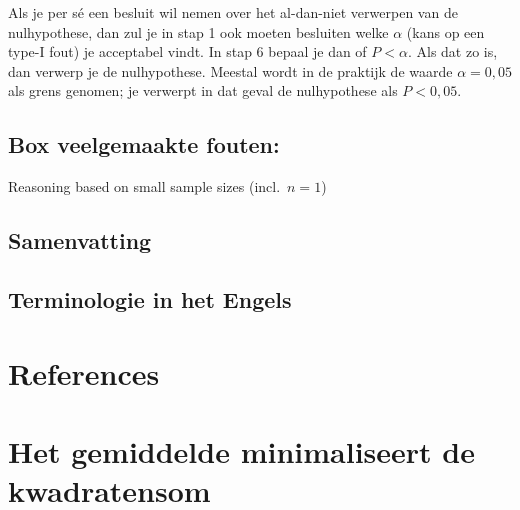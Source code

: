 \documentclass[
  a4paper,
]{scrbook}
\newlength{\cslhangindent}
\newenvironment{CSLReferences}[2] %
 {\begin{list}{}{%
  \setlength{\itemindent}{0pt}
  \setlength{\leftmargin}{0pt}
  \setlength{\parsep}{0pt}
  \ifodd #1
   \setlength{\leftmargin}{\cslhangindent}
   \setlength{\itemindent}{-1\cslhangindent}
  \fi
  \setlength{\itemsep}{#2\baselineskip}}}
 {\end{list}}
\theoremstyle{definition}
\theoremstyle{definition}
\theoremstyle{remark}
\begin{document}
Als je per sé een besluit wil nemen over het al-dan-niet verwerpen van
de nulhypothese, dan zul je in stap 1 ook moeten besluiten welke
\(\alpha\) (kans op een type-I fout) je acceptabel vindt. In stap 6
bepaal je dan of \(P < \alpha\). Als dat zo is, dan verwerp je de
nulhypothese. Meestal wordt in de praktijk de waarde \(\alpha = 0{,}05\)
als grens genomen; je verwerpt in dat geval de nulhypothese als
\(P < 0{,}05\).

\section{Box veelgemaakte fouten:}\label{box-veelgemaakte-fouten}

Reasoning based on small sample sizes (incl.~\(n = 1\))

\section{Samenvatting}\label{samenvatting-3}

\section{Terminologie in het Engels}\label{terminologie-in-het-engels-3}


\chapter*{References}\label{references}


\label{refs}
\begin{CSLReferences}{0}{1}
\end{CSLReferences}

\cleardoublepage
{}
{}
\appendix

\chapter{Het gemiddelde minimaliseert de
kwadratensom}\label{sec-kwadratensom}

\renewcommand{\ttdefault}{lcmtt}
\providecommand{\ped}[1]{_\textrm{#1}}
\providecommand{\ap}[1]{^\textrm{#1}}
\providecommand{\app}[1]{^\textrm{#1}}
\end{document}
